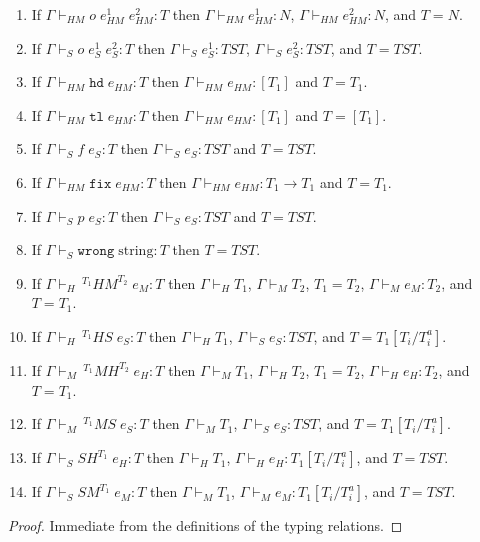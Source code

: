 \begin{lemma}
\begin{enumerate}
\item If $\Gamma\vdash_{HM}o\;e_{HM}^{1}\;e_{HM}^{2}:T$ then $\Gamma\vdash_{HM}e_{HM}^{1}:N$, $\Gamma\vdash_{HM}e_{HM}^{2}:N$, and $T=N$.
\item If $\Gamma\vdash_{S}o\;e_{S}^{1}\;e_{S}^{2}:T$ then $\Gamma\vdash_{S}e_{S}^{1}:TST$, $\Gamma\vdash_{S}e_{S}^{2}:TST$, and $T=TST$.
\item If $\Gamma\vdash_{HM}\mathtt{hd}\;e_{HM}:T$ then $\Gamma\vdash_{HM}e_{HM}:[T_{1}]$ and $T=T_{1}$.
\item If $\Gamma\vdash_{HM}\mathtt{tl}\;e_{HM}:T$ then $\Gamma\vdash_{HM}e_{HM}:[T_{1}]$ and $T=[T_{1}]$.
\item If $\Gamma\vdash_{S}f\;e_{S}:T$ then $\Gamma\vdash_{S}e_{S}:TST$ and $T=TST$.
\item If $\Gamma\vdash_{HM}\mathtt{fix}\;e_{HM}:T$ then $\Gamma\vdash_{HM}e_{HM}:T_{1}\rightarrow T_{1}$ and $T=T_{1}$.
\item If $\Gamma\vdash_{S}p\;e_{S}:T$ then $\Gamma\vdash_{S}e_{S}:TST$ and $T=TST$.
\item If $\Gamma\vdash_{S}\mathtt{wrong}\;\mathrm{string}:T$ then $T=TST$.
\item If $\Gamma\vdash_{H}\,^{T_{1}}HM^{T_{2}}\;e_{M}:T$ then $\Gamma\vdash_{H}T_{1}$, $\Gamma\vdash_{M}T_{2}$, $T_{1}=T_{2}$, $\Gamma\vdash_{M}e_{M}:T_{2}$, and $T=T_{1}$.
\item If $\Gamma\vdash_{H}\,^{T_{1}}HS\;e_{S}:T$ then $\Gamma\vdash_{H}T_{1}$, $\Gamma\vdash_{S}e_{S}:TST$, and $T=T_{1}[T_{i}/T_{i}^{a}]$.
\item If $\Gamma\vdash_{M}\,^{T_{1}}MH^{T_{2}}\;e_{H}:T$ then $\Gamma\vdash_{M}T_{1}$, $\Gamma\vdash_{H}T_{2}$, $T_{1}=T_{2}$, $\Gamma\vdash_{H}e_{H}:T_{2}$, and $T=T_{1}$.
\item If $\Gamma\vdash_{M}\,^{T_{1}}MS\;e_{S}:T$ then $\Gamma\vdash_{M}T_{1}$, $\Gamma\vdash_{S}e_{S}:TST$, and $T=T_{1}[T_{i}/T_{i}^{a}]$.
\item If $\Gamma\vdash_{S}SH^{T_{1}}\;e_{H}:T$ then $\Gamma\vdash_{H}T_{1}$, $\Gamma\vdash_{H}e_{H}:T_{1}[T_{i}/T_{i}^{a}]$, and $T=TST$.
\item If $\Gamma\vdash_{S}SM^{T_{1}}\;e_{M}:T$ then $\Gamma\vdash_{M}T_{1}$, $\Gamma\vdash_{M}e_{M}:T_{1}[T_{i}/T_{i}^{a}]$, and $T=TST$.
\end{enumerate}
\begin{proof}
Immediate from the definitions of the typing relations.
\end{proof}
\end{lemma}
